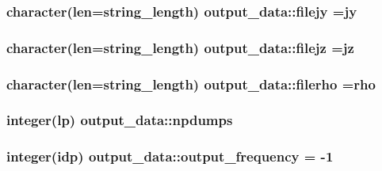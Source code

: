 \subsubsection[{\texorpdfstring{filejy}{filejy}}]{\setlength{\rightskip}{0pt plus 5cm}character(len=string\+\_\+length) output\+\_\+data\+::filejy =\textquotesingle{}jy\textquotesingle{}}\hypertarget{namespaceoutput__data_afaf1fb3c71c81a246f6af6ca881610ec}{}\label{namespaceoutput__data_afaf1fb3c71c81a246f6af6ca881610ec}
\subsubsection[{\texorpdfstring{filejz}{filejz}}]{\setlength{\rightskip}{0pt plus 5cm}character(len=string\+\_\+length) output\+\_\+data\+::filejz =\textquotesingle{}jz\textquotesingle{}}\hypertarget{namespaceoutput__data_a3656388605a302a6fc4c579fe82eb10b}{}\label{namespaceoutput__data_a3656388605a302a6fc4c579fe82eb10b}
\subsubsection[{\texorpdfstring{filerho}{filerho}}]{\setlength{\rightskip}{0pt plus 5cm}character(len=string\+\_\+length) output\+\_\+data\+::filerho =\textquotesingle{}rho\textquotesingle{}}\hypertarget{namespaceoutput__data_abd9468ccde074971628171196a7873f2}{}\label{namespaceoutput__data_abd9468ccde074971628171196a7873f2}
\subsubsection[{\texorpdfstring{npdumps}{npdumps}}]{\setlength{\rightskip}{0pt plus 5cm}integer(lp) output\+\_\+data\+::npdumps}\hypertarget{namespaceoutput__data_a1a9d2dcc12c89a8aaeb60ab9501f1008}{}\label{namespaceoutput__data_a1a9d2dcc12c89a8aaeb60ab9501f1008}
\subsubsection[{\texorpdfstring{output\+\_\+frequency}{output_frequency}}]{\setlength{\rightskip}{0pt plus 5cm}integer(idp) output\+\_\+data\+::output\+\_\+frequency = -\/1}\hypertarget{namespaceoutput__data_aa9299257a58dc37dd6c11e96a637459a}{}\label{namespaceoutput__data_aa9299257a58dc37dd6c11e96a637459a}
